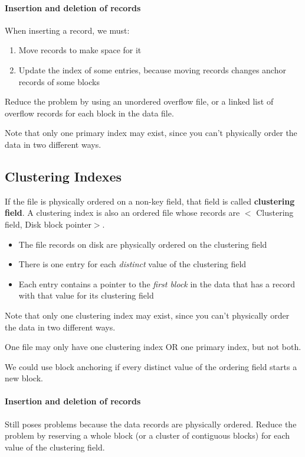 \paragraph{Insertion and deletion of records}
When inserting a record, we must:
    \begin{enumerate}
        \item Move records to make space for it
        \item Update the index of some entries, because moving records changes anchor records of some blocks
    \end{enumerate}
Reduce the problem by using an unordered overflow file, or a linked list of overflow records for each block in the data file.    

Note that only one primary index may exist, since you can't physically order the data in two different ways.

\subsection{Clustering Indexes}
If the file is physically ordered on a non-key field, that field is called \textbf{clustering field}. A clustering index is also an ordered file whose records are $<$ Clustering field, Disk block pointer$>$.
\begin{itemize}
    \item The file records on disk are physically ordered on the clustering field
    \item There is one entry for each \emph{distinct} value of the clustering field
    \item Each entry contains a pointer to the \emph{first block} in the data that has a record with that value for its clustering field
\end{itemize}
Note that only one clustering index may exist, since you can't physically order the data in two different ways.

One file may only have one clustering index OR one primary index, but not both. 

We could use block anchoring if every distinct value of the ordering field starts a new block.

\paragraph{Insertion and deletion of records}
Still poses problems because the data records are physically ordered. Reduce the problem by reserving a whole block (or a cluster of contiguous blocks) for each value of the clustering field.


